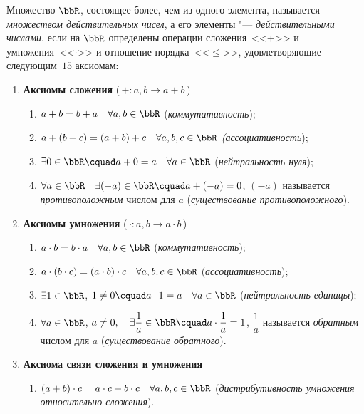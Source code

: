 \begin{defn}
Множество $\bbR$, состоящее более, чем из одного элемента, называется \textit{множеством действительных чисел}, а его элементы "--- \textit{действительными числами}, если на $\bbR$ определены операции сложения~<<$+$>> и умножения~<<$\cdot$>> и отношение порядка~<<$\le$>>, удовлетворяющие следующим~$15$ аксиомам:
\end{defn}

\begin{enumerate}[label=\Roman*.]
\item
\textbf{Аксиомы сложения} (\,$+\colon a,b \to a+b$\,)
\begin{enumerate}[label=\arabic*.]
\item 
$a + b = b + a\quad\forall a,b \in \bbR$ (\textit{коммутативность});
\item
$a + (b + c) = (a + b) + c\quad \forall a,b,c \in \bbR$ \textit{(ассоциативность});
\item
$\exists 0 \in \bbR\cquad a + 0 = a\quad \forall a \in \bbR$ (\textit{нейтральность нуля});
\item 
$\forall a \in \bbR \quad \exists (-a) \in \bbR\cquad a + (-a) = 0$, $(-a)$ называется \textit{противоположным} числом для $a$ (\textit{существование противоположного}).
\end{enumerate}
\item
\textbf{Аксиомы умножения} (\,$\cdot\colon a,b \to a\cdot b$\,)
\begin{enumerate}[resume, label=\arabic*.]
\item
$a\cdot b = b \cdot a \quad \forall a,b\in \bbR$ (\textit{коммутативность});
\item
$a \cdot (b \cdot c) = (a \cdot b) \cdot c\quad \forall a,b,c \in \bbR$ (\textit{ассоциативность});
\item 
$\exists 1 \in \bbR$, $1\ne 0\cquad a\cdot1 = a\quad \forall a\in \bbR$ (\textit{нейтральность единицы});
\item 
$\forall a\in \bbR$, $a\ne 0,\quad \exists \dfrac{1}{a} \in \bbR\cquad a\cdot \dfrac{1}{a} = 1$, $\dfrac{1}{a}$ называется \textit{обратным} числом для $a$ (\textit{существование обратного}).
\end{enumerate}
\item
\textbf{Аксиома связи сложения и умножения}
\begin{enumerate}[resume, label=\arabic*.]
\item
$(a+b) \cdot c = a\cdot c +  b\cdot c\quad \forall a,b,c \in \bbR$ (\textit{дистрибутивность умножения относительно сложения}).

\end{enumerate}
\end{enumerate}
